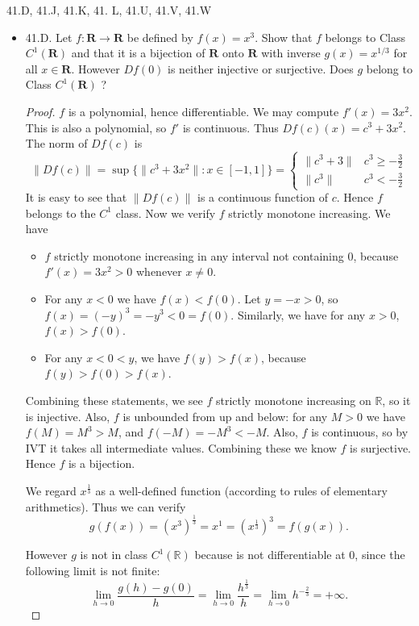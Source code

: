 
41.D, 41.J, 41.K, 41. L, 41.U, 41.V, 41.W
\begin{itemize}
	\item 41.D. Let $f: \boldsymbol{R} \rightarrow \boldsymbol{R}$ be defined by $f(x)=x^3$. Show that $f$ belongs to Class $C^{1}(\boldsymbol{R})$ and that it is a bijection of $\boldsymbol{R}$ onto $\mathbf{R}$ with inverse $g(x)=x^{1 / 3}$ for all $x \in \mathbf{R}$. However $D f(0)$ is neither injective or surjective. Does $g$ belong to Class $C^1(\boldsymbol{R})$ ?
\begin{proof}
	$f$ is a polynomial, hence differentiable. We may compute $f'(x) = 3 x^2$. This is also a polynomial, so  $f'$ is continuous. Thus $Df(c)(x) = c^3 + 3 x^2$. The norm of  $Df(c)$ is
	\[
		\|Df(c)\| = \operatorname{sup} \{\|c^3 + 3 x^2\|: x \in [-1,1]\} = \begin{cases}
			\|c^3 + 3\| & c^3 \ge  -\frac{3}{2} \\
			\|c^3\| & c^3 < -\frac{3}{2}
		\end{cases}
	\]
	It is easy to see that $\|Df(c)\|$ is a continuous function of $c$. Hence $f$ belongs to the $C^1$ class. Now we verify $f$ strictly monotone increasing. We have
	\begin{itemize}
		\item $f$ strictly monotone increasing in any interval not containing $0$, because $f'(x) = 3x^2 > 0$ whenever $x \neq 0$.
		\item For any $x < 0$ we have $f(x) < f(0)$. Let $y = -x > 0$, so $f(x) = (-y)^3 = -y^3 < 0 = f(0)$. Similarly, we have for any $x>0$, $f(x) > f(0).$
		\item For any $x < 0 < y$, we have $f(y) > f(x)$, because $f(y) > f(0) > f(x)$.
	\end{itemize}
	Combining these statements, we see $f$ strictly monotone increasing on $\mathbb{R}$, so it is injective. Also, $f$ is unbounded from up and below: for any $M > 0$ we have $f(M) = M^3 > M$, and $f(-M) = -M^3 < -M$. Also, $f$ is continuous, so by IVT it takes all intermediate values. Combining these we know $f$ is surjective. Hence $f$ is a bijection.

	We regard $x^{\frac{1}{3}}$ as a well-defined function (according to rules of elementary arithmetics). Thus we can verify 
	\[
		g(f(x)) = (x^3)^{\frac{1}{3}} = x^1 = (x^{\frac{1}{3}})^3 = f(g(x))
	.\] 

	However $g$ is not in class $C^1(\mathbb{R})$ because is not differentiable at $0$, since the following limit is not finite:
	\[
		\lim_{h \to 0} \frac{g(h) - g(0)}{h} = \lim_{h \to 0} \frac{h^{\frac{1}{3}}}{h} = \lim_{h \to 0} h^{-\frac{2}{3}} = +\infty 
	.\] 


\end{proof}
\end{itemize}
